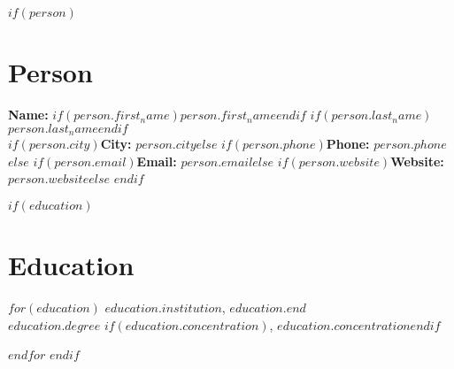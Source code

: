 \documentclass{article}
\begin{document}
$if(person)$
\section*{Person}

\def \fullName{%
  $if(person.first_name)$$person.first_name$$endif$
  $if(person.last_name)$$person.last_name$$endif$
}

\textbf{Name:} \fullName \\
$if(person.city)$\textbf{City:} $person.city$$else$%
$if(person.phone)$\textbf{Phone:} $person.phone$$else$%
$if(person.email)$\textbf{Email:} $person.email$$else$%
$if(person.website)$\textbf{Website:} $person.website$$else$%
$endif$

$if(education)$
\section*{Education}
$for(education)$
  \noindent
  \textbf{$education.institution$}, \textit{$education.end$} \\
  \textbf{$education.degree$}
  $if(education.concentration)$, \textit{$education.concentration$}$endif$
  \vspace{1em}

$endfor$
$endif$
\end{document}
